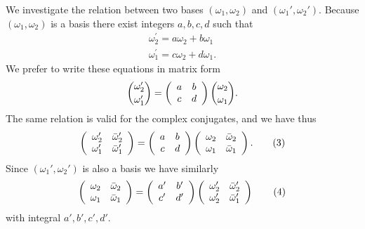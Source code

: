 We investigate the relation between two bases $(\omega_{1},\omega_{2})$ and $(\omega_1',\omega_2')$. Because $(\omega_{1},\omega_{2})$ is a basis there exist integers $a, b, c, d$ such that
\begin{equation*}
\begin{array}{r} \omega_ {2} ^ {\prime} = a \omega_ {2} + b \omega_ {1} \\ \omega_ {1} ^ {\prime} = c \omega_ {2} + d \omega_ {1}. \end{array}\tag{2}\label{eq:7.2}
\end{equation*}
We prefer to write these equations in matrix form
\begin{equation*}
\binom{\omega_ {2} ^ {\prime}}{\omega_ {1} ^ {\prime}} = \left( \begin{array}{c c} a & b \\ c & d \end{array} \right) \binom{\omega_ {2}}{\omega_ {1}}.
\end{equation*}
The same relation is valid for the complex conjugates, and we have thus
\begin{equation*}
\left( \begin{array}{c c} \omega_ {2} ^ {\prime} & \bar {\omega} _ {2} ^ {\prime} \\ \omega_ {1} ^ {\prime} & \bar {\omega} _ {1} ^ {\prime} \end{array} \right) = \left( \begin{array}{c c} a & b \\ c & d \end{array} \right) \left( \begin{array}{c c} \omega_ {2} & \bar {\omega} _ {2} \\ \omega_ {1} & \bar {\omega} _ {1} \end{array} \right).\tag{3}\label{eq:7.3}
\end{equation*}
Since $(\omega_1', \omega_2')$ is also a basis we have similarly
\begin{equation*}
\left( \begin{array}{c c} \omega_ {2} & \bar {\omega} _ {2} \\ \omega_ {1} & \bar {\omega} _ {1} \end{array} \right) = \left( \begin{array}{c c} a ^ {\prime} & b ^ {\prime} \\ c ^ {\prime} & d ^ {\prime} \end{array} \right) \left( \begin{array}{c c} \omega_ {2} ^ {\prime} & \bar {\omega} _ {2} ^ {\prime} \\ \omega_ {2} ^ {\prime} & \bar {\omega} _ {1} ^ {\prime} \end{array} \right)\tag{4}\label{eq:7.4}
\end{equation*}
with integral $a', b', c', d'$.

